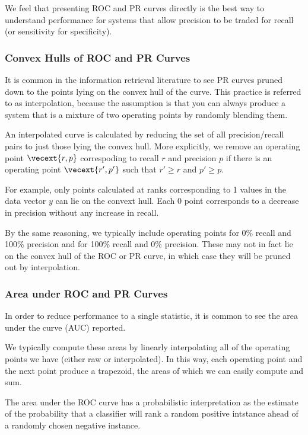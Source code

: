 We feel that presenting ROC and PR curves directly is the best way to
understand performance for systems that allow precision to be traded
for recall (or sensitivity for specificity).

\subsubsection{Convex Hulls of ROC and PR Curves}

It is common in the information retrieval literature to see PR curves
pruned down to the points lying on the convex hull of the curve.  This
practice is referred to as interpolation, because the assumption
is that you can always produce a system that is a mixture of two
operating points by randomly blending them.

An interpolated curve is calculated by reducing the set of all
precision/recall pairs to just those lying the convex hull.  More
explicitly, we remove an operating point $\vecext{r,p}$ correspoding
to recall $r$ and precision $p$ if there is an operating point
$\vecext{r',p'}$ such that $r' \geq r$ and $p' \geq p$.  

For example, only points calculated at ranks corresponding to 1 values
in the data vector $y$ can lie on the convext hull.  Each 0 point
corresponds to a decrease in precision without any increase in recall.  

By the same reasoning, we typically include operating points for 0\%
recall and 100\% precision and for 100\% recall and 0\% precision.
These may not in fact lie on the convex hull of the ROC or PR curve,
in which case they will be pruned out by interpolation.

\subsubsection{Area under ROC and PR Curves}

In order to reduce performance to a single statistic, it is common to
see the area under the curve (AUC) reported.  

We typically compute these areas by linearly interpolating all of the
operating points we have (either raw or interpolated).  In this way,
each operating point and the next point produce a trapezoid, the areas
of which we can easily compute and sum.

The area under the ROC curve has a probabilistic interpretation as the
estimate of the probability that a classifier will rank a random
positive intstance ahead of a randomly chosen negative instance.

